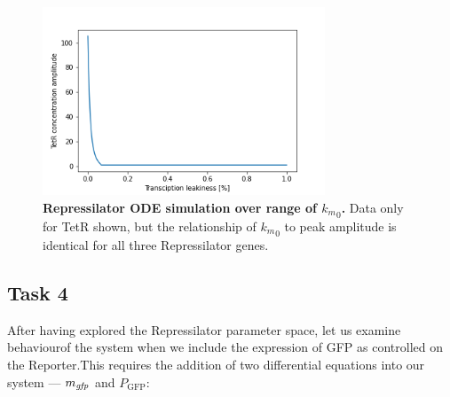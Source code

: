 \documentclass[runningheads,a4paper]{llncs}
\begin{document}
\begin{figure}
    \singlespacing
    \centering
    \includegraphics[width=0.75\textwidth]{suplementary_information_and_code/Task3_figure5.png}
    \caption{\textbf{Repressilator ODE simulation over range of ${k_{m}}_{0}$.} Data only for TetR shown, but the relationship of ${k_{m}}_{0}$ to peak amplitude is identical for all three Repressilator genes.}
    \label{fig:fig11}
\end{figure}

\clearpage
\subsection*{Task 4}
After having explored the Repressilator parameter space, let us examine behaviour\linebreak of the system when we include the expression of GFP as controlled on the Reporter.\linebreak This requires the addition of two differential equations into our system --- $m_{\textrm{\textit{gfp}}}$ and $P_{\textrm{GFP}}$:
\end{document}
